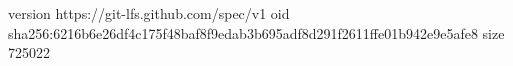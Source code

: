 version https://git-lfs.github.com/spec/v1
oid sha256:6216b6e26df4c175f48baf8f9edab3b695adf8d291f2611ffe01b942e9e5afe8
size 725022
